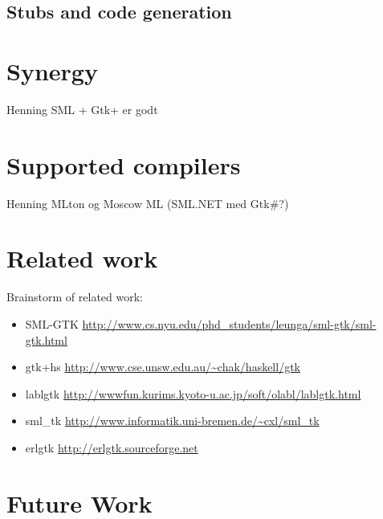 \documentclass[workingdraft,endnotes]{usetex-v1}
\begin{document}
\subsection{Stubs and code generation}
\label{sec:stubs-code-gener}





\section{Synergy}
\label{sec:synergy}

\begin{ednote}{Henning}
  SML + Gtk+ er godt
\end{ednote}



\section{Supported \sml compilers}
\label{sec:supp-sml-comp}

\begin{ednote}{Henning}
  MLton og Moscow ML (SML.NET med Gtk\#?)
\end{ednote}


\section{Related work}
\label{sec:related-work}

 Brainstorm of related work:
\begin{itemize}
\item SML-GTK 
\url{http://www.cs.nyu.edu/phd_students/leunga/sml-gtk/sml-gtk.html}

\item gtk+hs
\url{http://www.cse.unsw.edu.au/~chak/haskell/gtk}

\item lablgtk
\url{http://wwwfun.kurims.kyoto-u.ac.jp/soft/olabl/lablgtk.html}

\item sml\_tk
\url{http://www.informatik.uni-bremen.de/~cxl/sml_tk}

\item erlgtk
\url{http://erlgtk.sourceforge.net}

\end{itemize}



\section{Future Work}
\label{sec:future-work}
\end{document}

